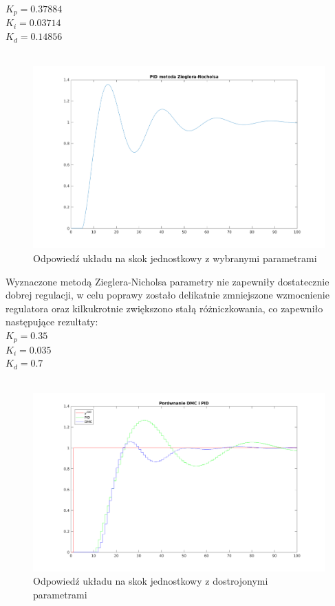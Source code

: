 \documentclass[a4paper, 11pt]{article}
\begin{document}
$K_p = 0.37884$\\
\indent$K_i = 0.03714$\\
\indent$K_d = 0.14856$\\
\\

\begin{figure}[H]
\centering
\includegraphics[scale=0.60]{2_1.png}
\caption{Odpowiedź układu na skok jednostkowy z wybranymi parametrami}
\label{skok}
\end{figure}


\noindent Wyznaczone metodą Zieglera-Nicholsa parametry nie zapewniły dostatecznie dobrej regulacji, w celu poprawy zostało delikatnie zmniejszone wzmocnienie regulatora oraz kilkukrotnie zwiększono stałą różniczkowania, co zapewniło następujące rezultaty: \\

$K_p = 0.35$\\
\indent$K_i = 0.035$\\
\indent$K_d = 0.7$\\
\\

\begin{figure}[H]
\centering
\includegraphics[scale=0.60]{2_1_1.png}
\caption{Odpowiedź układu na skok jednostkowy z dostrojonymi parametrami}
\label{skok}
\end{figure}
\end{document}
